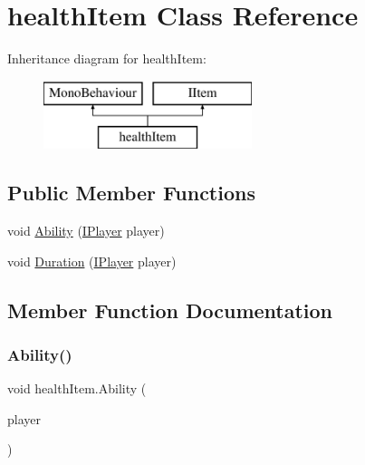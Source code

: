\hypertarget{classhealth_item}{}\section{health\+Item Class Reference}
\label{classhealth_item}
Inheritance diagram for health\+Item\+:\begin{figure}[H]
\begin{center}
\leavevmode
\includegraphics[height=2.000000cm]{classhealth_item}
\end{center}
\end{figure}
\subsection*{Public Member Functions}
\begin{DoxyCompactItemize}
\item 
void \mbox{\hyperlink{classhealth_item_a86f0e7f02919e7daa4076717a3a0acac}{Ability}} (\mbox{\hyperlink{class_i_player}{I\+Player}} player)
\item 
void \mbox{\hyperlink{classhealth_item_a545574879140f4c98b388f1dc7d2a7f8}{Duration}} (\mbox{\hyperlink{class_i_player}{I\+Player}} player)
\end{DoxyCompactItemize}


\subsection{Member Function Documentation}
\mbox{\label{classhealth_item_a86f0e7f02919e7daa4076717a3a0acac}} 
\subsubsection{\texorpdfstring{Ability()}{Ability()}}
{\footnotesize\ttfamily void health\+Item.\+Ability (\begin{DoxyParamCaption}\item[{\mbox{\hyperlink{class_i_player}{I\+Player}}}]{player }\end{DoxyParamCaption})\hspace{0.3cm}{\ttfamily [inline]}}


